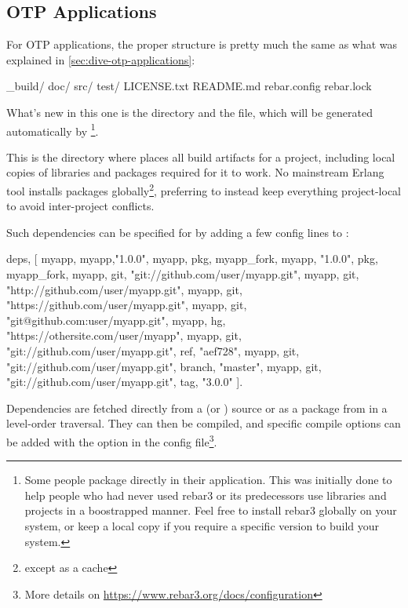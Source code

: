 \subsection{OTP Applications}
\label{subsec:building-otp-applications}

For OTP applications, the proper structure is pretty much the same as what was explained in \ref{sec:dive-otp-applications}:

\begin{VerbatimText}
_build/
doc/
src/
test/
LICENSE.txt
README.md
rebar.config
rebar.lock
\end{VerbatimText}

What's new in this one is the  directory and the  file, which will be generated automatically by \footnote{Some people package  directly in their application. This was initially done to help people who had never used rebar3 or its predecessors use libraries and projects in a boostrapped manner. Feel free to install rebar3 globally on your system, or keep a local copy if you require a specific version to build your system.}. 

This is the directory where  places all build artifacts for a project, including local copies of libraries and packages required for it to work. No mainstream Erlang tool installs packages globally\footnote{except as a cache}, preferring to instead keep everything project-local to avoid inter-project conflicts.

Such dependencies can be specified for  by adding a few config lines to :

\begin{VerbatimText}
{deps, [
  myapp,
  {myapp,"1.0.0"},
  {myapp, {pkg, myapp_fork}}, %
  {myapp, "1.0.0", {pkg, myapp_fork}},
  {myapp, {git, "git://github.com/user/myapp.git"}},
  {myapp, {git, "http://github.com/user/myapp.git"}},
  {myapp, {git, "https://github.com/user/myapp.git"}},
  {myapp, {git, "git@github.com:user/myapp.git"}},
  {myapp, {hg, "https://othersite.com/user/myapp"}},
  {myapp, {git, "git://github.com/user/myapp.git", {ref, "aef728"}}},
  {myapp, {git, "git://github.com/user/myapp.git", {branch, "master"}}},
  {myapp, {git, "git://github.com/user/myapp.git", {tag, "3.0.0"}}}
 ]}.
\end{VerbatimText}

Dependencies are fetched directly from a  (or ) source or as a package from \href{https://hex.pm}{} in a level-order traversal. They can then be compiled, and specific compile options can be added with the  option in the config file\footnote{More details on \href{https://www.rebar3.org/docs/configuration}{https://www.rebar3.org/docs/configuration}}. 

